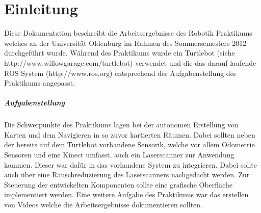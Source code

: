 \chapter{Einleitung}

Diese Dokumentation beschreibt die Arbeitsergebnisse des Robotik Praktikums welches an der Universität Oldenburg im Rahmen des Sommersemesters 2012 durchgeführt wurde. Während des Praktikums wurde ein Turtlebot (siehe http://www.willowgarage.com/turtlebot) verwendet und die das darauf laufende ROS System (http://www.ros.org) entsprechend der Aufgabenstellung des Praktikums angepasst.

\paragraph{Aufgabenstellung}

Die Schwerpunkte des Praktikums lagen bei der autonomen Erstellung von Karten und dem Navigieren in so zuvor kartierten Räumen. Dabei sollten neben der bereits auf dem Turtlebot vorhandene Sensorik, welche vor allem Odometrie Sensoren und eine Kinect umfasst, auch ein Laserscanner zur Anwendung kommen. Dieser war dafür in das vorhandene System zu integrieren. Dabei sollte auch über eine Rauschreduzierung des Laserscanners nachgedacht werden. Zur Steuerung der entwickelten Komponenten sollte eine grafische Oberfläche implementiert werden.
Eine weitere Aufgabe des Praktikums war das erstellen von Videos welche die Arbeitsergebnisse dokumentieren sollten.